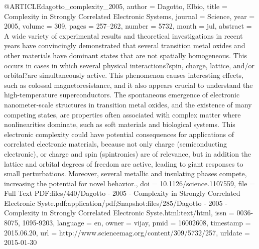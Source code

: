 @ARTICLE{dagotto_complexity_2005,
  author = {Dagotto, Elbio},
  title = {Complexity in {Strongly} {Correlated} {Electronic} {Systems}},
  journal = {Science},
  year = {2005},
  volume = {309},
  pages = {257--262},
  number = {5732},
  month = jul,
  abstract = {A wide variety of experimental results and theoretical investigations
	in recent years have convincingly demonstrated that several transition
	metal oxides and other materials have dominant states that are not
	spatially homogeneous. This occurs in cases in which several physical
	interactions?spin, charge, lattice, and/or orbital?are simultaneously
	active. This phenomenon causes interesting effects, such as colossal
	magnetoresistance, and it also appears crucial to understand the
	high-temperature superconductors. The spontaneous emergence of electronic
	nanometer-scale structures in transition metal oxides, and the existence
	of many competing states, are properties often associated with complex
	matter where nonlinearities dominate, such as soft materials and
	biological systems. This electronic complexity could have potential
	consequences for applications of correlated electronic materials,
	because not only charge (semiconducting electronic), or charge and
	spin (spintronics) are of relevance, but in addition the lattice
	and orbital degrees of freedom are active, leading to giant responses
	to small perturbations. Moreover, several metallic and insulating
	phases compete, increasing the potential for novel behavior.},
  doi = {10.1126/science.1107559},
  file = {Full Text PDF:files/440/Dagotto - 2005 - Complexity in Strongly Correlated Electronic Syste.pdf:application/pdf;Snapshot:files/285/Dagotto - 2005 - Complexity in Strongly Correlated Electronic Syste.html:text/html},
  issn = {0036-8075, 1095-9203},
  language = {en},
  owner = {vijay},
  pmid = {16002608},
  timestamp = {2015.06.20},
  url = {http://www.sciencemag.org/content/309/5732/257},
  urldate = {2015-01-30}
}

